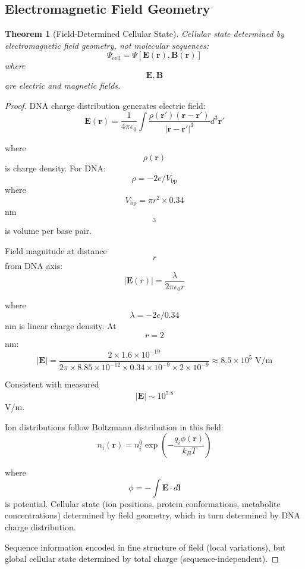 \documentclass[11pt,twocolumn,a4paper]{article}
\newtheorem{theorem}{Theorem}[section]
\theoremstyle{remark}
\begin{document}
\subsection{Electromagnetic Field Geometry}

\begin{theorem}[Field-Determined Cellular State]
\label{thm:field_state}
Cellular state determined by electromagnetic field geometry, not molecular sequences:
$$
\Psi_{\mathrm{cell}} = \Psi[\mathbf{E}(\mathbf{r}), \mathbf{B}(\mathbf{r})]
$$
where $$\mathbf{E}, \mathbf{B}$$ are electric and magnetic fields.
\end{theorem}

\begin{proof}
DNA charge distribution generates electric field:
$$
\mathbf{E}(\mathbf{r}) = \frac{1}{4\pi\epsilon_0} \int \frac{\rho(\mathbf{r}')(\mathbf{r} - \mathbf{r}')}{|\mathbf{r} - \mathbf{r}'|^3} d^3\mathbf{r}'
$$

where $$\rho(\mathbf{r})$$ is charge density. For DNA: $$\rho = -2e/V_{\mathrm{bp}}$$ where $$V_{\mathrm{bp}} = \pi r^2 \times 0.34$$ nm$$^3$$ is volume per base pair.

Field magnitude at distance $$r$$ from DNA axis:
$$
|\mathbf{E}(r)| = \frac{\lambda}{2\pi\epsilon_0 r}
$$

where $$\lambda = -2e/0.34$$ nm is linear charge density. At $$r = 2$$ nm:
$$
|\mathbf{E}| = \frac{2 \times 1.6 \times 10^{-19}}{2\pi \times 8.85 \times 10^{-12} \times 0.34 \times 10^{-9} \times 2 \times 10^{-9}} \approx 8.5 \times 10^5 \text{ V/m}
$$

Consistent with measured $$|\mathbf{E}| \sim 10^{5.8}$$ V/m.

Ion distributions follow Boltzmann distribution in this field:
$$
n_i(\mathbf{r}) = n_i^0 \exp\left(-\frac{q_i \phi(\mathbf{r})}{k_B T}\right)
$$

where $$\phi = -\int \mathbf{E} \cdot d\mathbf{l}$$ is potential. Cellular state (ion positions, protein conformations, metabolite concentrations) determined by field geometry, which in turn determined by DNA charge distribution.

Sequence information encoded in fine structure of field (local variations), but global cellular state determined by total charge (sequence-independent).
\end{proof}
\end{document}
